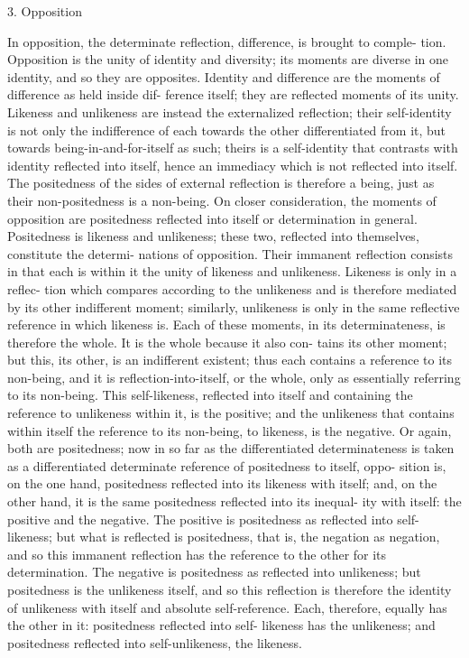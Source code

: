 3. Opposition

In opposition, the determinate reflection, difference, is brought to comple-
tion. Opposition is the unity of identity and diversity; its moments are
diverse in one identity, and so they are opposites.
Identity and difference are the moments of difference as held inside dif-
ference itself; they are reflected moments of its unity. Likeness and unlikeness
are instead the externalized reflection; their self-identity is not only the
indifference of each towards the other differentiated from it, but towards
being-in-and-for-itself as such; theirs is a self-identity that contrasts with
identity reflected into itself, hence an immediacy which is not reflected into
itself. The positedness of the sides of external reflection is therefore a being,
just as their non-positedness is a non-being.
On closer consideration, the moments of opposition are positedness
reflected into itself or determination in general. Positedness is likeness and
unlikeness; these two, reflected into themselves, constitute the determi-
nations of opposition. Their immanent reflection consists in that each is
within it the unity of likeness and unlikeness. Likeness is only in a reflec-
tion which compares according to the unlikeness and is therefore mediated
by its other indifferent moment; similarly, unlikeness is only in the same
reflective reference in which likeness is.  Each of these moments, in its
determinateness, is therefore the whole. It is the whole because it also con-
tains its other moment; but this, its other, is an indifferent existent; thus
each contains a reference to its non-being, and it is reflection-into-itself, or
the whole, only as essentially referring to its non-being.
This self-likeness, reflected into itself and containing the reference to
unlikeness within it, is the positive; and the unlikeness that contains within
itself the reference to its non-being, to likeness, is the negative.  Or again,
both are positedness; now in so far as the differentiated determinateness is
taken as a differentiated determinate reference of positedness to itself, oppo-
sition is, on the one hand, positedness reflected into its likeness with itself;
and, on the other hand, it is the same positedness reflected into its inequal-
ity with itself: the positive and the negative.  The positive is positedness as
reflected into self-likeness; but what is reflected is positedness, that is, the
negation as negation, and so this immanent reflection has the reference to
the other for its determination. The negative is positedness as reflected into
unlikeness; but positedness is the unlikeness itself, and so this reflection is
therefore the identity of unlikeness with itself and absolute self-reference.
Each, therefore, equally has the other in it: positedness reflected into self-
likeness has the unlikeness; and positedness reflected into self-unlikeness,
the likeness.

